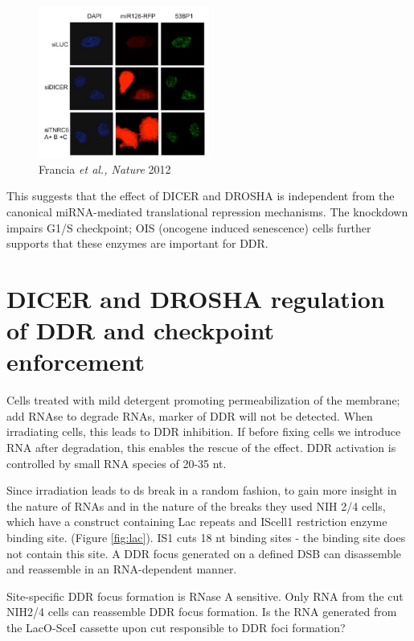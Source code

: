 \begin{figure}
\centering
\includegraphics[width=0.5\textwidth]{Screen_Shot_2022-12-07_at_08-59-12.png}
\caption{Francia \emph{et al., Nature} 2012}
\label{fig:si}
\end{figure}

This suggests that the effect of DICER and DROSHA is independent from the canonical miRNA-mediated translational repression mechanisms. The knockdown impairs G1/S checkpoint; OIS (oncogene induced senescence) cells further supports that these enzymes are important for DDR.

\hypertarget{dicer-and-drosh-regulation-of-ddr-and-checkpoint-enforcement}{%
\section{DICER and DROSHA regulation of DDR and checkpoint enforcement}\label{dicer-and-drosh-regulation-of-ddr-and-checkpoint-enforcement}}

Cells treated with mild detergent promoting permeabilization of the membrane; add RNAse to degrade RNAs, marker of DDR will not be detected. When irradiating cells, this leads to DDR inhibition. If before fixing cells we introduce RNA after degradation, this enables the rescue of the effect. DDR activation is controlled by small RNA species of 20-35 nt.

Since irradiation leads to ds break in a random fashion, to gain more insight in the nature of RNAs and in the nature of the breaks they used NIH 2/4 cells, which have a construct containing Lac repeats and IScell1 restriction enzyme binding site. (Figure \ref{fig:lac}).  IS1 cuts 18 nt binding sites - the binding site does not contain this site. A DDR focus generated on a defined DSB can disassemble and reassemble in an RNA-dependent manner.

Site-specific DDR focus formation is RNase A sensitive. Only RNA from the cut NIH2/4 cells can reassemble DDR focus formation. Is the RNA generated from the LacO-SceI cassette upon cut responsible to DDR foci formation?

